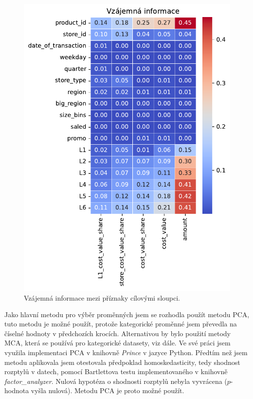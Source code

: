 \begin{figure}[h!]
    \centering
    \includegraphics[width=\textwidth]{obrazky/pripravadat/matrix_MI-everything-SFF-stores-002.pdf}
    \caption{Vzájemná informace mezi příznaky cílovými sloupci.}
    \label{obr:nb:MI_FS}

  \end{figure}

Jako hlavní metodu pro výběr proměnných jsem se rozhodla použít metodu PCA, tuto metodu je možné použít, protože kategorické proměnné jsem převedla na číselné hodnoty v předchozích krocích. Alternativou by bylo použití metody MCA, která se používá pro kategorické datasety, viz dále.
Ve své práci jsem využila implementaci PCA v knihovně \emph{Prince} v jazyce Python. 
Předtím než jsem metodu aplikovala jsem otestovala předpoklad homoskedasticity, tedy shodnost rozptylů v datech, pomocí Bartlettova testu implementovaného v knihovně \emph{factor\_analyzer}. Nulová hypotéza o shodnosti rozptylů nebyla vyvrácena ($p$-hodnota vyšla nulová). Metodu PCA je proto možné použít.

